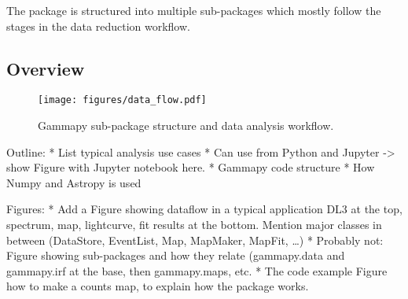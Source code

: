 The \gammapy package is structured into multiple sub-packages which mostly
follow the stages in the data reduction workflow.

\subsection{Overview}
\label{ssec:overview}
\begin{figure*}[t]
	\centering
	\texttt{[image: figures/data\_flow.pdf]}
	\caption{
		Gammapy sub-package structure and data analysis workflow. }
	\label{fig:data_flow} \end{figure*}

Outline: * List typical analysis use cases * Can use from Python and Jupyter ->
show Figure with Jupyter notebook here. * Gammapy code structure * How Numpy
and Astropy is used

Figures: * Add a Figure showing dataflow in a typical application DL3 at the
top, spectrum, map, lightcurve, fit results at the bottom. Mention major
classes in between (DataStore, EventList, Map, MapMaker, MapFit, …) * Probably
not: Figure showing sub-packages and how they relate (gammapy.data and
gammapy.irf at the base, then gammapy.maps, etc. * The code example Figure how
to make a counts map, to explain how the package works.














